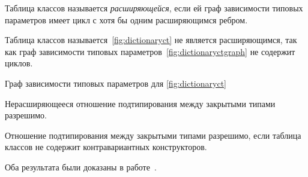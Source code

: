 \begin{defn}
Таблица классов называется \emph{расширяющейся}, если ей граф зависимости типовых параметров имеет цикл с хотя бы одним расширяющимся ребром.
\end{defn}

\begin{exmp}
Таблица классов называется~\autoref{fig:dictionaryct} не является расширяющимся, так как граф зависимости типовых параметров~\autoref{fig:dictionaryctgraph} не содержит циклов.
\begin{Figure}
    \caption{Граф зависимости типовых параметров для \autoref{fig:dictionaryct}}
    \label{fig:dictionaryctgraph}
\end{Figure}
\end{exmp}

\begin{prop}\label{thm:nonexpansive-decidable}
Нерасширяющееся отношение подтипирования между закрытыми типами разрешимо.
\end{prop}

\begin{prop}
Отношение подтипирования между закрытыми типами разрешимо, если таблица классов не содержит контравариантных конструкторов.
\end{prop}

Оба результата были доказаны в работе~\cite{kennedy2006decidability}.
